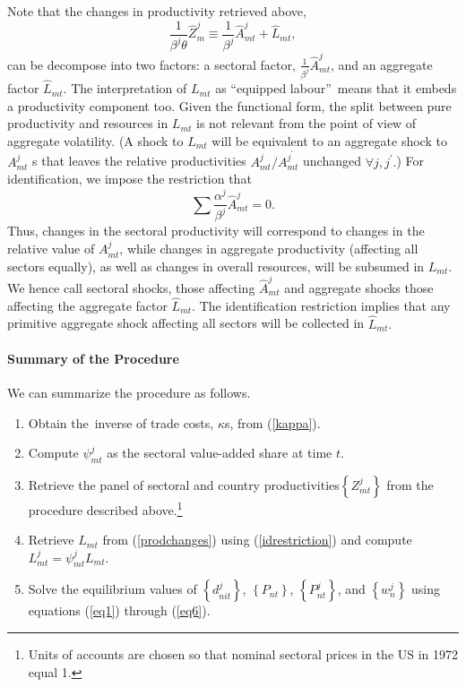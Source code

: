\documentclass{article}
\begin{document}
Note that the changes in productivity retrieved above, 
\begin{equation}
\frac{1}{\beta ^{j}\theta }\hat{Z}_{m}^{j}\equiv \frac{1}{\beta ^{j}}\hat{A}%
_{mt}^{j}+\hat{L}_{mt},  \label{prodchanges}
\end{equation}%
can be decompose into two factors: a sectoral factor, $\frac{1}{\beta ^{j}}%
\hat{A}_{mt}^{j}$, and an aggregate factor $\hat{L}_{mt}$. The
interpretation of $L_{mt}$ as \textquotedblleft equipped
labour\textquotedblright\ means that it embeds a productivity component too.
Given the functional form, the split between pure productivity and resources
in $L_{mt}$ is not relevant from the point of view of aggregate volatility.
(A shock to $L_{mt}$ will be equivalent to an aggregate shock to $A_{mt}^{j}$%
s that leaves the relative productivities $A_{mt}^{j}/A_{mt}^{j^{\prime }}$
unchanged $\forall j,j^{\prime }.$) For identification, we impose the
restriction that 
\begin{equation}
\sum \frac{\alpha ^{j}}{\beta ^{j}}\hat{A}_{mt}^{j}=0.  \label{idrestriction}
\end{equation}%
Thus, changes in the sectoral productivity will correspond to changes in the
relative value of $A_{mt}^{j}$, while changes in aggregate productivity
(affecting all sectors equally), as well as changes in overall resources,
will be subsumed in $L_{mt}$. We hence call sectoral shocks, those affecting 
$\hat{A}_{mt}^{j}$ and aggregate shocks those affecting the aggregate factor 
$\hat{L}_{mt}$. The identification restriction implies that any primitive
aggregate shock affecting all sectors will be collected in $\hat{L}_{mt}.$

\paragraph{Summary of the Procedure}

We can summarize the procedure as follows.

\begin{enumerate}
\item Obtain the\ inverse of trade costs, $\kappa $s, from (\ref{kappa}).

\item Compute $\psi _{mt}^{j}$ as the sectoral value-added share at time $t$.

\item Retrieve the panel of sectoral and country productivities$\left\{
Z_{mt}^{j}\right\} $ from the procedure described above.\footnote{%
Units of accounts are chosen so that nominal sectoral prices in the US in
1972 equal 1.}

\item Retrieve $L_{mt}$ from (\ref{prodchanges}) using (\ref{idrestriction})
and compute $L_{mt}^{j}=\psi _{mt}^{j}L_{mt}.$

\item Solve the equilibrium values of $\left\{ d_{nit}^{j}\right\} $, $%
\left\{ P_{nt}\right\} $, $\left\{ P_{nt}^{j}\right\} $, and $\left\{
w_{n}^{j}\right\} $ using equations (\ref{eq1}) through (\ref{eq6}).
\end{enumerate}
\end{document}
